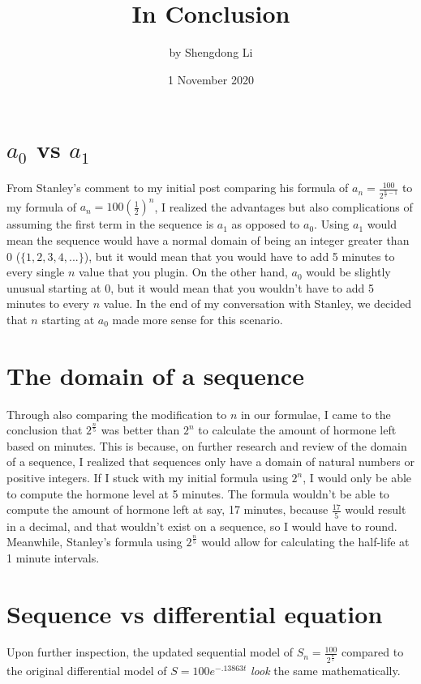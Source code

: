 \documentclass[12pt]{article}
\begin{document}
\title{In Conclusion}
\author{by Shengdong Li}
\date{1 November 2020}
\maketitle

\section{\texorpdfstring{$a_{0}$}{Lg} vs \texorpdfstring{$a_{1}$}{Lg}}
From Stanley's comment to my initial post comparing his formula of $a_{n}=\frac{100}{2^{\frac{n}{5}-1}}$ to my formula of $a_{n}=100\left(\frac{1}{2}\right)^{n}$, I realized the advantages but also complications of assuming the first term in the sequence is $a_{1}$ as opposed to $a_{0}$. Using $a_{1}$ would mean the sequence would have a normal domain of being an integer greater than 0 ($\{1,2,3,4,...\}$), but it would mean that you would have to add 5 minutes to every single $n$ value that you plugin. On the other hand, $a_{0}$ would be slightly unusual starting at 0, but it would mean that you wouldn't have to add 5 minutes to every $n$ value. In the end of my conversation with Stanley, we decided that $n$ starting at $a_{0}$ made more sense for this scenario.

\section{The domain of a sequence}
Through also comparing the modification to $n$ in our formulae, I came to the conclusion that $2^{\frac{n}{5}}$ was better than $2^{n}$ to calculate the amount of hormone left based on minutes. This is because, on further research and review of the domain of a sequence, I realized that sequences only have a domain of natural numbers or positive integers. If I stuck with my initial formula using $2^{n}$, I would only be able to compute the hormone level at 5 minutes. The formula wouldn't be able to compute the amount of hormone left at say, 17 minutes, because $\frac{17}{5}$ would result in a decimal, and that wouldn't exist on a sequence, so I would have to round. Meanwhile, Stanley's formula using $2^{\frac{n}{5}}$ would allow for calculating the half-life at 1 minute intervals.

\section{Sequence vs differential equation}
Upon further inspection, the updated sequential model of $S_{n}=\frac{100}{2^{\frac{n}{5}}}$ compared to the original differential model of $S=100e^{-.13863t}$ \textit{look} the same mathematically.
\end{document}

